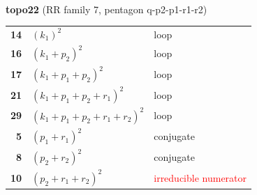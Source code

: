 \documentclass[10pt]{article}
\begin{document}
\begin{minipage}[t]{0.48\textwidth}
{}\\[2mm]\textbf{topo22} (RR family 7, pentagon q-p2-p1-r1-r2)\\[2pt]{\footnotesize\begin{tabular}{@{}r@{\ \ }l@{\ \ }l@{}}\textbf{14} & $(k_1)^2$ & loop\\
\textbf{16} & $(k_1+p_2)^2$ & loop\\
\textbf{17} & $(k_1+p_1+p_2)^2$ & loop\\
\textbf{21} & $(k_1+p_1+p_2+r_1)^2$ & loop\\
\textbf{29} & $(k_1+p_1+p_2+r_1+r_2)^2$ & loop\\
\textbf{5} & $(p_1+r_1)^2$ & conjugate\\
\textbf{8} & $(p_2+r_2)^2$ & conjugate\\
\textbf{10} & $(p_2+r_1+r_2)^2$ & \textcolor{red}{irreducible numerator}\\\end{tabular}}\end{minipage}

\bigskip
\end{document}
